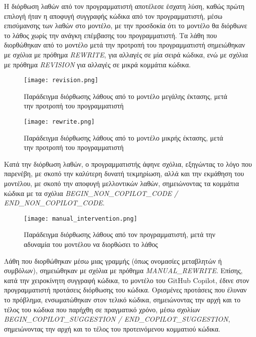   Η διόρθωση λαθών από τον προγραμματιστή αποτέλεσε έσχατη λύση, καθώς
  πρώτη επιλογή ήταν η αποφυγή συγγραφής κώδικα από τον προγραμματιστή,
  μέσω επισύμανσης των λαθών στο μοντέλο, με την προσδοκία ότι το μοντέλο
  θα διόρθωνε το λάθος χωρίς την ανάγκη επέμβασης του προγραμματιστή. Τα
  λάθη που διορθώθηκαν από το μοντέλο μετά την προτροπή του προγραμματιστή
  σημειώθηκαν με σχόλια με πρόθημα \textlatin{\textit{REWRITE}}, για
  αλλαγές σε μία σειρά κώδικα, ενώ με σχόλια με πρόθημα
  \textlatin{\textit{REVISION}} για αλλαγές σε μικρά κομμάτια κώδικα.

  \begin{figure}[H]
    \begin{center}
      \texttt{[image: revision.png]}
      \caption{Παράδειγμα διόρθωσης λάθους από το μοντέλο μεγάλης έκτασης,
      μετά την προτροπή του προγραμματιστή}
    \end{center}
    \label{fig:revision}
  \end{figure}

  \begin{figure}[H]
    \begin{center}
      \texttt{[image: rewrite.png]}
      \caption{Παράδειγμα διόρθωσης λάθους από το μοντέλο μικρής έκτασης,
      μετά την προτροπή του προγραμματιστή}
    \end{center}
    \label{fig:rewrite}
  \end{figure}

  Κατά την διόρθωση λαθών, ο προγραμματιστής άφηνε σχόλια, εξηγώντας το
  λόγο που παρενέβη, με σκοπό την καλύτερη δυνατή τεκμηρίωση, αλλά και την
  εκμάθηση του μοντέλου, με σκοπό την αποφυγή μελλοντικών λαθών,
  σημειώνοντας τα κομμάτια κώδικα με τα σχόλια
  \textlatin{\textit{BEGIN\_NON\_COPILOT\_CODE /
  END\_NON\_COPILOT\_CODE}}.

  \begin{figure}[H]
    \begin{center}
      \texttt{[image: manual\_intervention.png]}
      \caption{Παράδειγμα διόρθωσης λάθους από τον προγραμματιστή, μετά
      την αδυναμία του μοντέλου να διορθώσει το λάθος}
    \end{center}
    \label{fig:nonCopilotCode}
  \end{figure}

  Λάθη που διορθώθηκαν μέσω μιας γραμμής (όπως ονομασίες μεταβλητών ή
  συμβόλων), σημειώθηκαν με σχόλια με πρόθημα
  \textlatin{\textit{MANUAL\_REWRITE}}. Επίσης, κατά την χειροκίνητη
  συγγραφή κώδικα, το μοντέλο του \textlatin{GitHub Copilot}, έδινε στον
  προγραμματιστή προτάσεις διόρθωσης του κώδικα. Ορισμένες προτάσεις που
  έλυναν το πρόβλημα, ενσωματώθηκαν στον τελικό κώδικα, σημειώνοντας την
  αρχή και το τέλος του κώδικα που παρήχθη σε πραγματικό χρόνο, μέσω
  σχολίων \textlatin{\textit{BEGIN\_COPILOT\_SUGGESTION /
  END\_COPILOT\_SUGGESTION}}, σημειώνοντας την αρχή και το τέλος του
  προτεινόμενου κομματιού κώδικα.

